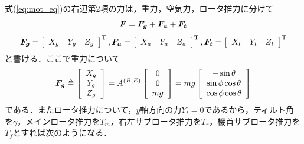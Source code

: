 式(\ref{eq:mot_eq})の右辺第2項の力は，重力，空気力，ロータ推力に分けて
\begin{equation}
    \mbox{\boldmath $F$} = \mbox{\boldmath $F_g$} + \mbox{\boldmath $F_a$} + \mbox{\boldmath $F_t$}
\end{equation}
\begin{align*}
  \mbox{\boldmath $F_g$} =
  \left[
  \begin{array}{c}
    X_g \quad Y_g \quad Z_g
  \end{array}
  \right]^{\mathrm{T}},
  \mbox{\boldmath $F_a$} =
  \left[
  \begin{array}{c}
    X_a \quad Y_a \quad Z_a
  \end{array}
  \right]^{\mathrm{T}},
  \mbox{\boldmath $F_t$} =
  \left[
  \begin{array}{c}
    X_t \quad Y_t \quad Z_t
  \end{array}
  \right]^{\mathrm{T}}
\end{align*}
と書ける．ここで重力について
\begin{equation}
  \mbox{\boldmath $F_g$} \triangleq
  \left[
  \begin{array}{ccc}
    X_g \\
    Y_g \\
    Z_g
  \end{array}
  \right] =
  A^{(B,E)}
  \left[
  \begin{array}{ccc}
    0 \\
    0 \\
    mg
  \end{array}
  \right] = mg
  \left[
  \begin{array}{ccc}
    -\sin\theta \\
    \sin\phi\cos\theta \\
    \cos\phi\cos\theta
  \end{array}
  \right]
  \label{eq:F_g}
\end{equation}
である．またロータ推力について，$y$軸方向の力$Y_t=0$であるから，ティルト角を$\gamma$，メインロータ推力を$T_m$，右左サブロータ推力を$T_r$，機首サブロータ推力を$T_f$とすれば次のようになる．
